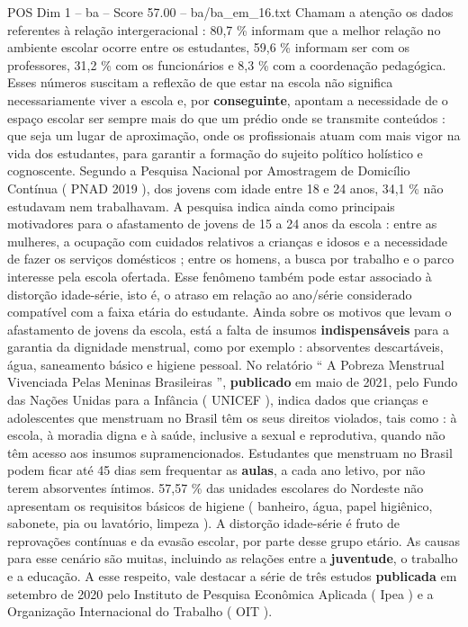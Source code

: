 \begin{textsample}{POS Dim 1 – ba – Score 57.00 – ba/ba\_em\_16.txt}
Chamam a atenção os dados referentes à relação intergeracional : 80,7 \% informam que a melhor relação no ambiente escolar ocorre entre os estudantes, 59,6 \% informam ser com os professores, 31,2 \% com os funcionários e 8,3 \% com a coordenação pedagógica.
Esses números suscitam a reflexão de que estar na escola não significa necessariamente viver a escola e, por \textbf{conseguinte}, apontam a necessidade de o espaço escolar ser sempre mais do que um prédio onde se transmite conteúdos : que seja um lugar de aproximação, onde os profissionais atuam com mais vigor na vida dos estudantes, para garantir a formação do sujeito político holístico e cognoscente.
Segundo a Pesquisa Nacional por Amostragem de Domicílio Contínua ( PNAD 2019 ), dos jovens com idade entre 18 e 24 anos, 34,1 \% não estudavam nem trabalhavam.
A pesquisa indica ainda como principais motivadores para o afastamento de jovens de 15 a 24 anos da escola : entre as mulheres, a ocupação com cuidados relativos a crianças e idosos e a necessidade de fazer os serviços domésticos ; entre os homens, a busca por trabalho e o parco interesse pela escola ofertada.
Esse fenômeno também pode estar associado à distorção idade-série, isto é, o atraso em relação ao ano/série considerado compatível com a faixa etária do estudante.
Ainda sobre os motivos que levam o afastamento de jovens da escola, está a falta de insumos \textbf{indispensáveis} para a garantia da dignidade menstrual, como por exemplo : absorventes descartáveis, água, saneamento básico e higiene pessoal.
No relatório “ A Pobreza Menstrual Vivenciada Pelas Meninas Brasileiras ”, \textbf{publicado} em maio de 2021, pelo Fundo das Nações Unidas para a Infância ( UNICEF ), indica dados que crianças e adolescentes que menstruam no Brasil têm os seus direitos violados, tais como : à escola, à moradia digna e à saúde, inclusive a sexual e reprodutiva, quando não têm acesso aos insumos supramencionados.
Estudantes que menstruam no Brasil podem ficar até 45 dias sem frequentar as \textbf{aulas}, a cada ano letivo, por não terem absorventes íntimos. 57,57 \% das unidades escolares do Nordeste não apresentam os requisitos básicos de higiene ( banheiro, água, papel higiênico, sabonete, pia ou lavatório, limpeza ).
A distorção idade-série é fruto de reprovações contínuas e da evasão escolar, por parte desse grupo etário.
As causas para esse cenário são muitas, incluindo as relações entre a \textbf{juventude}, o trabalho e a educação.
A esse respeito, vale destacar a série de três estudos \textbf{publicada} em setembro de 2020 pelo Instituto de Pesquisa Econômica Aplicada ( Ipea ) e a Organização Internacional do Trabalho ( OIT ).

\end{textsample}
